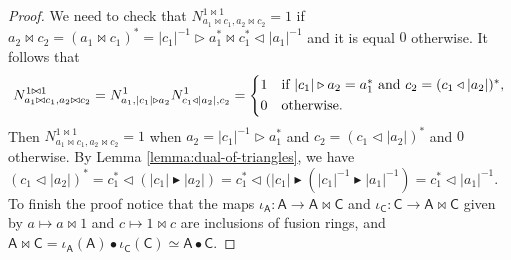 \documentclass[10pt,a4paper]{amsart}
\newcommand{\degf}[1]{\left|#1\right|}
\newcommand{\fiz}{\triangleleft}
\newcommand{\trid}{\triangleright}
\newcommand{\tridb}{\blacktriangleright}
\begin{document}
\begin{proof}
We need to check that $N^{1\bowtie 1}_{a_1\bowtie c_1, a_2\bowtie c_2} = 1$ if $a_2\bowtie c_2 = (a_1\bowtie c_1)^* =\degf{c_1}^{-1}\trid a_1^* \bowtie c_1^* \fiz \degf{a_1}^{-1}$ and it is equal $0$ otherwise. It follows that
\begin{align*}
N^{1\bowtie 1}_{a_1\bowtie c_1, a_2\bowtie c_2}=N^1_{a_1, \degf{c_1}\trid a_2}N^1_{c_1\fiz \degf{a_2}, c_2 } = \begin{dcases*}
    1 & if $\degf{c_1}\trid a_2 = a_1^*$ and $c_2= (c_1\fiz \degf{a_2})^*$,\\
    0 & otherwise.
\end{dcases*}
\end{align*}
Then $N^{1\bowtie 1}_{a_1\bowtie c_1, a_2\bowtie c_2} = 1$ when $a_2 =  \degf{c_1}^{-1}\trid a_1^* $ and $c_2 = (c_1\fiz \degf{a_2})^*$ and $0$ otherwise. By Lemma \ref{lemma:dual-of-triangles}, 
we have $(c_1\fiz \degf{a_2})^* = c_1^* \fiz (\degf{c_1}\tridb \degf{a_2})=c_1^* \fiz (\degf{c_1}\tridb (\degf{c_1}^{-1}\tridb \degf{a_1}^{-1})=c_1^* \fiz\degf{a_1}^{-1}$.
  To finish the proof notice that the maps $\iota_{\mathsf A}\colon \mathsf A \to \mathsf A\bowtie \mathsf C$ and $\iota_{\mathsf C}\colon \mathsf C \to \mathsf A\bowtie \mathsf C$ given by $a\mapsto a\bowtie 1$ and $c\mapsto 1\bowtie c$ are inclusions of fusion rings, and $\mathsf A\bowtie \mathsf C =\iota_{\mathsf A}(\mathsf A) \bullet \iota_{\mathsf C}(\mathsf C) \simeq \mathsf A \bullet \mathsf C$.
\end{proof}
\end{document}
